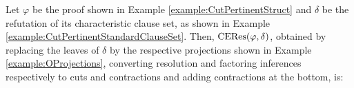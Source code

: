 \documentclass{llncs}
\begin{document}
\begin{landscape}
\begin{example}
\label{example:CEResSONormalForm}
Let $\varphi$ be the proof shown in Example \ref{example:CutPertinentStruct} and $\delta$ be the refutation of its characteristic clause set, as shown in Example \ref{example:CutPertinentStandardClauseSet}. Then, $\mathrm{CERes}(\varphi,\delta)$, obtained by replacing the leaves of $\delta$ by the respective projections shown in Example \ref{example:OProjections}, converting resolution and factoring inferences respectively to cuts and contractions and adding contractions at the bottom, is:


\end{example}
\end{landscape}
\end{document}
